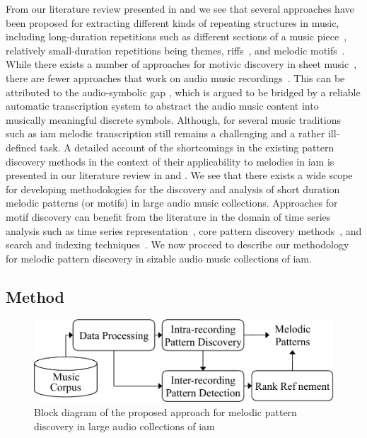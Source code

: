 From our literature review presented in  and  we see that several approaches have been proposed for extracting different kinds of repeating structures in music, including long-duration repetitions such as different sections of a music piece~\citep{serra2012unsupervised,Goto06TASLP, paulus2010state}, relatively small-duration repetitions being themes, riffs~\citep{Hsu2001a}, and melodic motifs~\citep{meredith2002algorithms,collins2011improved,Janssen2013}. While there exists a number of approaches for motivic discovery in sheet music~\citep{meredith2002algorithms,Cambouropoulos2006,conklin2001representation,Lartillot2005}, there are fewer approaches that work on audio music recordings~\citep{dannenberg2003pattern}. This can be attributed to the audio-symbolic gap \citep{collins2014bridging}, which is argued to be bridged by a reliable automatic transcription system to abstract the audio music content into musically meaningful discrete symbols. Although, for several music traditions such as \gls{iam} melodic transcription still remains a challenging and a rather ill-defined task.  A detailed account of the shortcomings in the existing pattern discovery methods in the context of their applicability to melodies in \gls{iam} is presented in our literature review in  and . We see that there exists a wide scope for developing methodologies for the discovery and analysis of short duration melodic patterns (or motifs) in large audio music collections. Approaches for motif discovery can benefit from the literature in the domain of time series analysis such as time series representation~\citep{Lin2003}, core pattern discovery methods~\citep{Mueen2009}, and search and indexing techniques~\citep{Rakthanmanon2013}. We now proceed to describe our methodology for melodic pattern discovery in sizable audio music collections of \gls{iam}.


\subsection{Method}
\label{sec:patterns_discovery_method}

\begin{figure}
	\begin{center}
		\includegraphics[width=\figSizeEightyFive]{ch06_patterns/figures/discovery/blockDiagram_Overall.pdf}
	\end{center}
	\caption[Block diagram for melodic pattern discovery]{Block diagram of the proposed approach for melodic pattern discovery in large audio collections of \gls{iam}}
	\label{fig:pattern_discovery_overall_block_diagram}
\end{figure}

